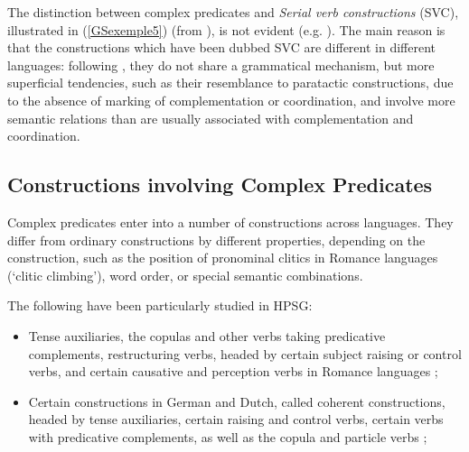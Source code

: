 \documentclass[output=paper
                ,modfonts
                ,nonflat
	        ,collection
	        ,collectionchapter
	        ,collectiontoclongg
 	        ,biblatex
                ,babelshorthands
                ,newtxmath
                ,draftmode
                ,colorlinks, citecolor=brown
]{./langsci/langscibook}
\begin{document}
{The distinction between complex predicates and \emph{Serial verb constructions} (SVC), illustrated in (\ref{GSexemple5}) (from \citealt{MH2016}), is not evident (e.g. \citealt{andrews1999complex, MH2016}). The main reason is that the constructions which have been dubbed SVC are different in different languages: following \cite{andrews1999complex}, they do not share a grammatical mechanism, but more superficial tendencies, such as their resemblance to paratactic constructions, due to the absence of marking of complementation or coordination, and involve more semantic relations than are usually associated with complementation and coordination.

\z

\subsection{Constructions involving Complex Predicates}\label{GSsection1.2}

Complex predicates enter into a number of constructions across languages. They differ from ordinary constructions by different properties, depending on the construction, such as the position of pronominal clitics in Romance languages (`clitic climbing'), word order, or special semantic combinations. 

The following have been particularly studied in HPSG:

\begin{itemize}
	
	\item Tense auxiliaries, the copulas and other verbs taking predicative complements, restructuring verbs, headed by certain subject raising or control verbs, and certain causative and perception verbs in Romance languages \citep{abeille1994complementation, abeille2000french, abeille2001deux, abeille2001varieties, AG2002b-u, AG2010, abeille1995doublestructure, AGMS98a, AGS1998, Monachesi98a};
	
	\item Certain constructions in German and Dutch, called coherent constructions, headed by tense auxiliaries, certain raising and control verbs, certain verbs with predicative complements, as well as the copula and particle verbs \citep{HN89b, HN94a, Rentier94, Kiss94, Kiss95a, BvN98a, HN98a, Kathol98b, Kathol2000a, Meurers2000b-Short, DM2002, dKM2001a,  Mueller2002b, Mueller2003a, muller2018clause};
	

\end{itemize}}
\end{document}
